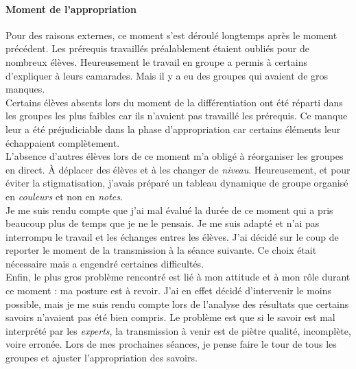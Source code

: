 \paragraph{Moment de l'appropriation}
%
Pour des raisons externes, ce moment s'est déroulé longtemps après le moment précédent. Les prérequis travaillés préalablement étaient oubliés pour de nombreux élèves. Heureusement le travail en groupe a permis à certains d'expliquer à leurs camarades. Mais il y a eu des groupes qui avaient de gros manques.
\\
Certains élèves absents lors du moment de la différentiation ont été réparti dans les groupes les plus faibles car ils n'avaient pas travaillé les prérequis. Ce manque leur a été préjudiciable dans la phase d'appropriation car certains éléments leur échappaient complètement.
\\
L'absence d'autres élèves lors de ce moment m'a obligé à réorganiser les groupes en direct. À déplacer des élèves et à les changer de \emph{niveau}. Heureusement, et pour éviter la stigmatisation, j'avais préparé un tableau dynamique de groupe organisé en \emph{couleurs} et non en \emph{notes}.
\\
Je me suis rendu compte que j'ai mal évalué la durée de ce moment qui a pris beaucoup plus de temps que je ne le pensais. Je me suis adapté et n'ai pas interrompu le travail et les échanges entres les élèves. J'ai décidé sur le coup de reporter le moment de la transmission à la séance suivante. Ce choix était nécessaire mais a engendré certaines difficultés.
\\
Enfin, le plus gros problème rencontré est lié à mon attitude et à mon rôle durant ce moment : ma posture est à revoir. J'ai en effet décidé d'intervenir le moins possible, mais je me suis rendu compte lors de l'analyse des résultats que certains savoirs n'avaient pas été bien compris. Le problème est que si le savoir est mal interprété par les \emph{experts}, la transmission à venir est de piètre qualité, incomplète, voire erronée. Lors de mes prochaines séances, je pense faire le tour de tous les groupes et ajuster l'appropriation des savoirs.


